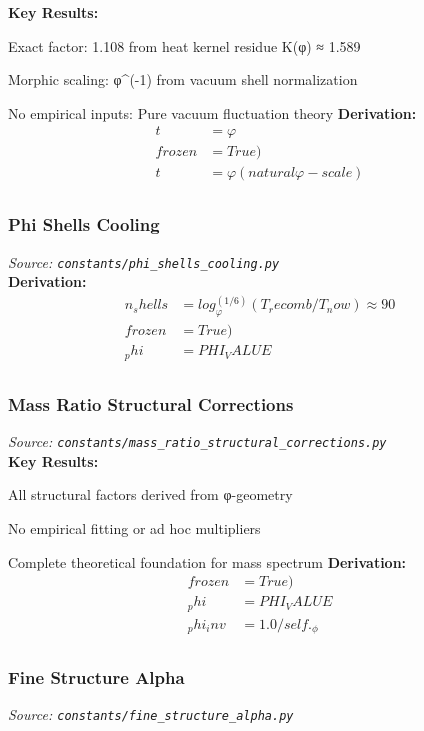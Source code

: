 \textbf{Key Results:}
\item Exact factor: 1.108 from heat kernel residue K(φ) ≈ 1.589
\item Morphic scaling: φ^(-1) from vacuum shell normalization
\item No empirical inputs: Pure vacuum fluctuation theory
\textbf{Derivation:}
\begin{align}
t &= φ \\
frozen &= True) \\
t &= φ (natural φ-scale) \\
\end{align}

\subsubsection{Phi Shells Cooling}
\textit{Source: \texttt{constants/phi_shells_cooling.py}}\\

\textbf{Derivation:}
\begin{align}
n_shells &= log_φ^(1/6)(T_recomb/T_now) ≈ 90 \\
frozen &= True) \\
_phi &= PHI_VALUE \\
\end{align}

\subsubsection{Mass Ratio Structural Corrections}
\textit{Source: \texttt{constants/mass_ratio_structural_corrections.py}}\\

\textbf{Key Results:}
\item All structural factors derived from φ-geometry
\item No empirical fitting or ad hoc multipliers
\item Complete theoretical foundation for mass spectrum
\textbf{Derivation:}
\begin{align}
frozen &= True) \\
_phi &= PHI_VALUE \\
_phi_inv &= 1.0 / self._\phi \\
\end{align}

\subsubsection{Fine Structure Alpha}
\textit{Source: \texttt{constants/fine_structure_alpha.py}}\\

